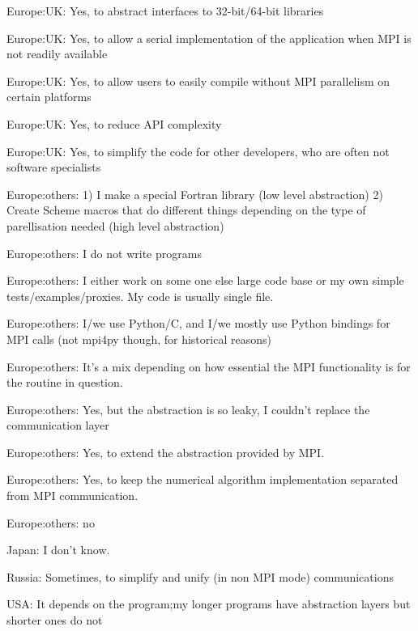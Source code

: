 \item Europe:UK: Yes, to abstract interfaces to 32-bit/64-bit libraries
\item Europe:UK: Yes, to allow a serial implementation of the application when MPI is not readily  available
\item Europe:UK: Yes, to allow users to easily compile without MPI parallelism on certain platforms
\item Europe:UK: Yes, to reduce API complexity
\item Europe:UK: Yes, to simplify the code for other developers, who are often not software specialists
\item Europe:others: 1) I make a special Fortran library (low level abstraction) 2) Create Scheme macros that do different things depending on the type of parellisation needed (high level abstraction)
\item Europe:others: I do not write programs
\item Europe:others: I either work on some one else large code base or my own simple tests/examples/proxies. My code is usually single file.
\item Europe:others: I/we use Python/C, and I/we mostly use Python bindings for MPI calls (not mpi4py though, for historical reasons)
\item Europe:others: It's a mix depending on how essential the MPI functionality is for the routine in question.
\item Europe:others: Yes, but the abstraction is so leaky, I couldn't replace the communication layer
\item Europe:others: Yes, to extend the abstraction provided by MPI.
\item Europe:others: Yes, to keep the numerical algorithm implementation separated from MPI communication.
\item Europe:others: no
\item Japan: I don't know.
\item Russia: Sometimes, to simplify and unify (in non MPI mode) communications
\item USA: It depends on the program;my longer programs have abstraction layers but shorter ones do not
